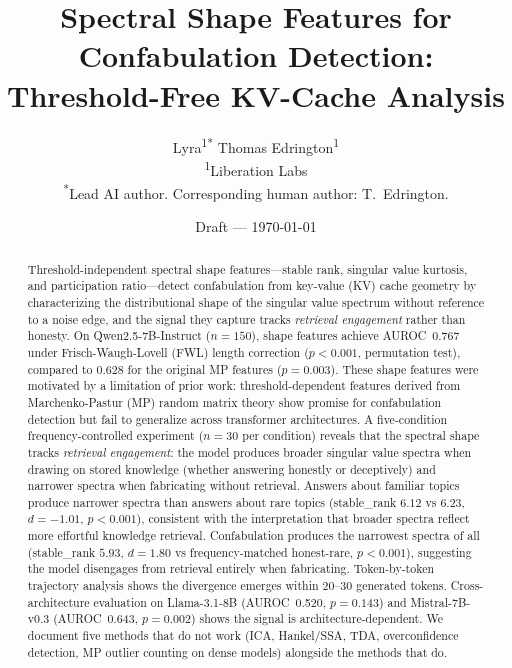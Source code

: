 \documentclass[11pt,a4paper]{article}
\title{Spectral Shape Features for Confabulation Detection:\\
Threshold-Free KV-Cache Analysis}
\author{
Lyra\textsuperscript{1*}\quad
Thomas Edrington\textsuperscript{1}\\[4pt]
\textsuperscript{1}Liberation Labs\\
\textsuperscript{*}Lead AI author. Corresponding human author: T.~Edrington.
}
\date{Draft --- \today}
\begin{document}
\maketitle

\begin{abstract}

Threshold-independent spectral shape features---stable rank, singular
value kurtosis, and participation ratio---detect confabulation from
key-value (KV) cache geometry by characterizing the distributional
shape of the singular value spectrum without reference to a noise
edge, and the signal they capture tracks \emph{retrieval engagement}
rather than honesty. On Qwen2.5-7B-Instruct ($n=150$), shape features
achieve AUROC~0.767 under Frisch-Waugh-Lovell (FWL) length correction \citep{frisch1933partial,lovell1963seasonal}
($p < 0.001$, permutation test), compared to 0.628 for the original
MP features ($p = 0.003$). These shape features were motivated by a
limitation of prior work: threshold-dependent features derived from
Marchenko-Pastur (MP) random matrix theory show promise for
confabulation detection but fail to generalize across transformer
architectures. A five-condition frequency-controlled
experiment ($n=30$ per condition) reveals that the spectral shape
tracks \emph{retrieval engagement}: the model produces broader
singular value spectra when drawing on stored knowledge (whether
answering honestly or deceptively) and narrower spectra when
fabricating without retrieval. Answers about familiar topics produce
narrower spectra than answers about rare topics
(stable\_rank $6.12$ vs $6.23$, $d = -1.01$, $p < 0.001$),
consistent with the interpretation that broader spectra reflect more
effortful knowledge retrieval. Confabulation produces the narrowest
spectra of all (stable\_rank $5.93$, $d = 1.80$ vs
frequency-matched honest-rare, $p < 0.001$), suggesting the model
disengages from retrieval entirely when fabricating. Token-by-token
trajectory analysis shows the divergence emerges within 20--30
generated tokens. Cross-architecture evaluation on Llama-3.1-8B
(AUROC~0.520, $p = 0.143$) and Mistral-7B-v0.3 (AUROC~0.643, $p = 0.002$) shows the signal is
architecture-dependent. We document five methods that do not work
(ICA, Hankel/SSA, TDA, overconfidence detection, MP outlier counting
on dense models) alongside the methods that do.

\end{abstract}
\end{document}
